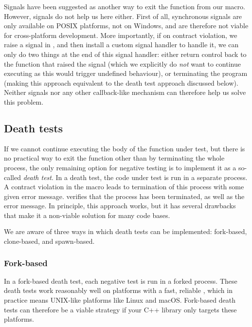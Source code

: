 Signals have been suggested as another way to exit the function from our  macro. However, signals do not help us here either. First of all, synchronous signals are only available on POSIX platforms, not on Windows, and are therefore not viable for cross-platform development. More importantly, if on contract violation, we raise a signal in , and then install a custom signal handler to handle it, we can only do two things at the end of this signal handler: either return control back to the function that raised the signal (which we explicitly do \emph{not} want to continue executing as this would trigger undefined behaviour), or terminating the program (making this approach equivalent to the death test approach discussed below). Neither signals nor any other callback-like mechanism can therefore help us solve this problem.

\subsection{Death tests}
\label{subsec:deathtests}

If we cannot continue executing the body of the function under test, but there is no practical way to exit the function other than by terminating the whole process, the only remaining option for negative testing is to implement it as a so-called \emph{death test}. In a death test, the code under test is run in a separate process. A contract violation in the  macro leads to termination of this process with some given error message.  verifies that the process has been terminated, as well as the error message. In principle, this approach works, but it has several drawbacks that make it a non-viable solution for many code bases.

We are aware of three ways in which death tests can be implemented: fork-based, clone-based, and spawn-based.

\subsubsection{Fork-based}

In a fork-based death test, each negative test is run in a forked process. These death tests work reasonably well on platforms with a fast, reliable , which in practice means UNIX-like platforms like Linux and macOS. Fork-based death tests can therefore be a viable strategy if your C++ library only targets these platforms.

